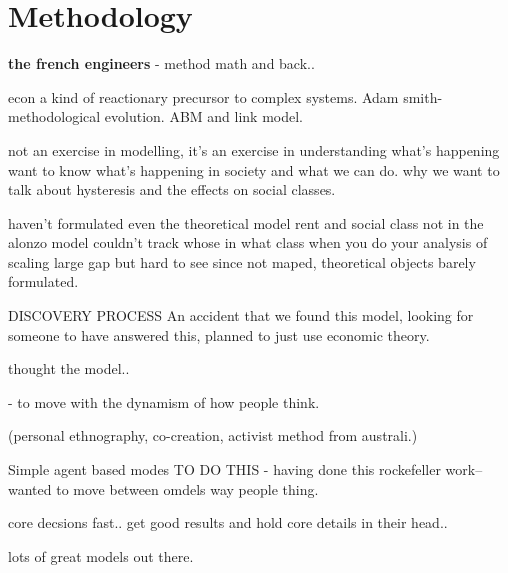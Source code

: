 \chapter{Methodology} \label{chapter-methodology}



\textbf{the french engineers} - method math and back..

econ a kind of reactionary precursor to complex systems.  Adam smith- methodological evolution. ABM and link model.

not an exercise in modelling, it's an exercise in understanding what's happening
want to know what's happening in society and what we can do. why we want to talk about hysteresis and the effects on social classes.

haven't formulated even the theoretical model
rent and social class not in the alonzo model
couldn't track whose in what class when you do your analysis of scaling
large gap but hard to see since not maped, theoretical objects barely formulated.

DISCOVERY PROCESS
An accident that we found this model, looking for someone to have answered this, planned to just use economic theory.

thought the model.. 

- to move with the dynamism of how people think. 

(personal ethnography, co-creation, activist method from australi.)

Simple agent based modes
TO DO THIS -
having done this rockefeller work-- wanted to move between omdels way people thing.

core decsions fast..
get good results and hold core details in their head..

lots of great models out there. 

